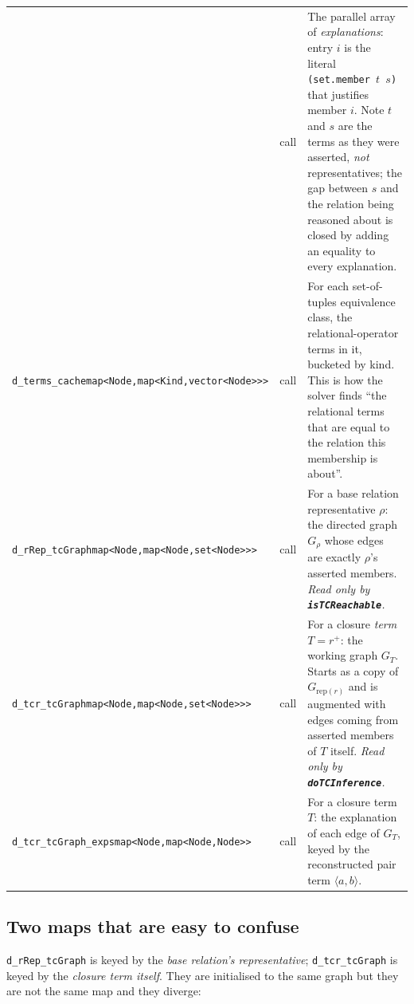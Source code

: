 \documentclass[11pt,a4paper]{article}
\newcommand{\code}[1]{\texttt{\small #1}}
\newcommand{\fn}[1]{\texttt{\small\bfseries #1}}
\newcommand{\tup}[1]{\langle #1 \rangle}
\newcommand{\tc}[1]{{#1}^{+}}
\newcommand{\rep}[1]{\mathrm{rep}(#1)}
\theoremstyle{definition}
\begin{document}
\begin{center}
\begin{longtable}{@{}p{4.35cm}p{1.0cm}p{9.4cm}@{}}
  & call &
  The parallel array of \emph{explanations}: entry $i$ is the literal
  \code{(set.member $t$ $s$)} that justifies member $i$. Note $t$ and $s$ are
  the terms as they were asserted, \emph{not} representatives; the gap between
  $s$ and the relation being reasoned about is closed by adding an equality to
  every explanation.\\
\code{d\_terms\_cache}\newline\scriptsize\code{map<Node,\allowbreak{}map<Kind,\allowbreak{}vector<Node>>>}
  & call &
  For each set-of-tuples equivalence class, the relational-operator terms in
  it, bucketed by kind. This is how the solver finds ``the relational terms
  that are equal to the relation this membership is about''.\\
\code{d\_rRep\_tcGraph}\newline\scriptsize\code{map<Node,\allowbreak{}map<Node,\allowbreak{}set<Node>>>} &
  call &
  For a base relation representative $\rho$: the directed graph $G_\rho$ whose
  edges are exactly $\rho$'s asserted members. \emph{Read only by
  \fn{isTCReachable}.}\\
\code{d\_tcr\_tcGraph}\newline\scriptsize\code{map<Node,\allowbreak{}map<Node,\allowbreak{}set<Node>>>} &
  call &
  For a closure \emph{term} $T=\tc{r}$: the working graph $G_T$. Starts as a
  copy of $G_{\rep{r}}$ and is augmented with edges coming from asserted
  members of $T$ itself. \emph{Read only by \fn{doTCInference}.}\\
\code{d\_tcr\_tcGraph\_exps}\newline\scriptsize\code{map<Node,\allowbreak{}map<Node,Node>>} &
  call &
  For a closure term $T$: the explanation of each edge of $G_T$, keyed by the
  reconstructed pair term $\tup{a,b}$.\\
\bottomrule
\end{longtable}
\label{tab:fields}
\end{center}

\subsection{Two maps that are easy to confuse}

\code{d\_rRep\_tcGraph} is keyed by the \emph{base relation's representative};
\code{d\_tcr\_tcGraph} is keyed by the \emph{closure term itself}. They are
initialised to the same graph but they are not the same map and they diverge:
\end{document}
